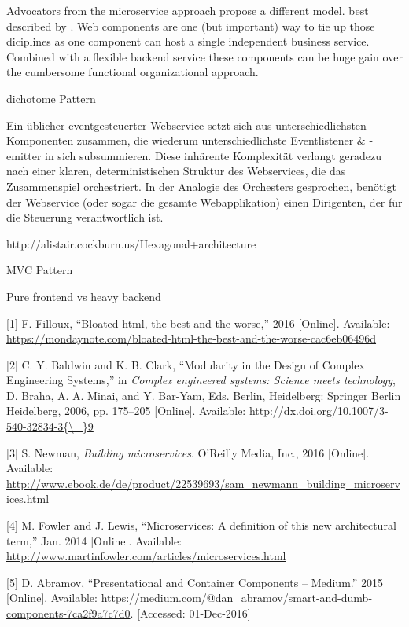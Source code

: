 \documentclass[]{article}
\begin{document}
Advocators from the microservice approach propose a different model.
best described by . Web components are one (but important) way to tie up
those diciplines as one component can host a single independent business
service. Combined with a flexible backend service these components can
be huge gain over the cumbersome functional organizational approach.

dichotome Pattern

Ein üblicher eventgesteuerter Webservice setzt sich aus
unterschiedlichsten Komponenten zusammen, die wiederum
unterschiedlichste Eventlistener \& -emitter in sich subsummieren. Diese
inhärente Komplexität verlangt geradezu nach einer klaren,
deterministischen Struktur des Webservices, die das Zusammenspiel
orchestriert. In der Analogie des Orchesters gesprochen, benötigt der
Webservice (oder sogar die gesamte Webapplikation) einen Dirigenten, der
für die Steuerung verantwortlich ist.

http://alistair.cockburn.us/Hexagonal+architecture

MVC Pattern

Pure frontend vs heavy backend

\hypertarget{refs}{}
\hypertarget{ref-Filloux2016}{}
{[}1{]} F. Filloux, ``Bloated html, the best and the worse,'' 2016
{[}Online{]}. Available:
\url{https://mondaynote.com/bloated-html-the-best-and-the-worse-cac6eb06496d}

\hypertarget{ref-Baldwin2006}{}
{[}2{]} C. Y. Baldwin and K. B. Clark, ``Modularity in the Design of
Complex Engineering Systems,'' in \emph{Complex engineered systems:
Science meets technology}, D. Braha, A. A. Minai, and Y. Bar-Yam, Eds.
Berlin, Heidelberg: Springer Berlin Heidelberg, 2006, pp. 175--205
{[}Online{]}. Available:
\href{http://dx.doi.org/10.1007/3-540-32834-3\%7B/_\%7D9}{http://dx.doi.org/10.1007/3-540-32834-3\{\textbackslash{}\_\}9}

\hypertarget{ref-Newman2015}{}
{[}3{]} S. Newman, \emph{Building microservices}. O'Reilly Media, Inc.,
2016 {[}Online{]}. Available:
\url{http://www.ebook.de/de/product/22539693/sam_newmann_building_microservices.html}

\hypertarget{ref-Fowler2014}{}
{[}4{]} M. Fowler and J. Lewis, ``Microservices: A definition of this
new architectural term,'' Jan. 2014 {[}Online{]}. Available:
\url{http://www.martinfowler.com/articles/microservices.html}

\hypertarget{ref-Abramov2015}{}
{[}5{]} D. Abramov, ``Presentational and Container Components --
Medium.'' 2015 {[}Online{]}. Available:
\url{https://medium.com/@dan_abramov/smart-and-dumb-components-7ca2f9a7c7d0}.
{[}Accessed: 01-Dec-2016{]}
\end{document}
